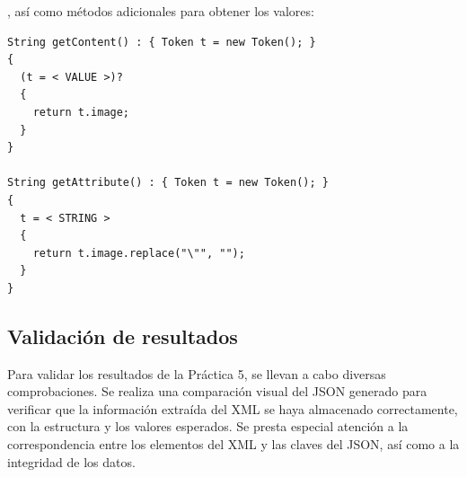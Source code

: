 , así como métodos adicionales para obtener los valores:

\lstset{inputencoding=utf8/latin1}
\begin{lstlisting}
String getContent() : { Token t = new Token(); }
{
  (t = < VALUE >)?
  {
    return t.image;
  } 
}

String getAttribute() : { Token t = new Token(); }
{
  t = < STRING > 
  {
    return t.image.replace("\"", "");
  } 
}
\end{lstlisting}






\subsection{Validación de resultados}

Para validar los resultados de la Práctica 5, se llevan a cabo diversas comprobaciones. Se realiza una comparación visual del JSON generado para verificar que la información extraída del XML se haya almacenado correctamente, con la estructura y los valores esperados. Se presta especial atención a la correspondencia entre los elementos del XML y las claves del JSON, así como a la integridad de los datos.

